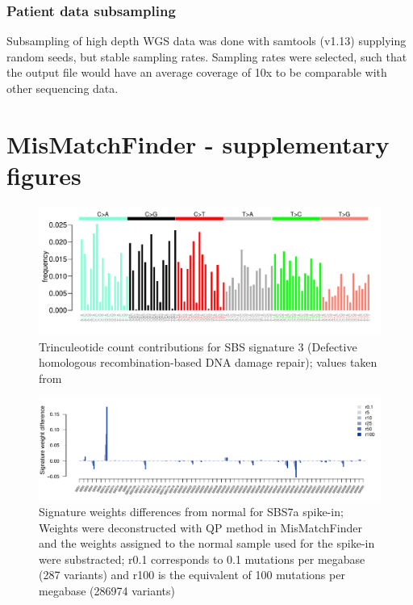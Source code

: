 \subsection{Patient data subsampling}
\label{ch-mmfAppendix:subsampling}
Subsampling of high depth WGS data was done with samtools (v1.13) supplying random seeds, but stable sampling rates. Sampling rates were selected, such that the output file would have an average coverage of 10x to be comparable with other sequencing data.



\chapter*{MisMatchFinder - supplementary figures}

\begin{figure}[ht]
\centering
\includegraphics[width=.99\linewidth]{Figures/MisMatchFinder/SBS3Signature.pdf}
\caption[Trinculeotide count contributions for single base substitution (SBS) signature 3]{Trinculeotide count contributions for SBS signature 3 (Defective homologous recombination-based DNA damage repair); values taken from \protect\textcite{Alexandrov2020}}\label{A:fig:sig3}
\end{figure}

\begin{figure}[ht]
\centering
\includegraphics[width=.99\linewidth]{Figures/MisMatchFinder/SBS7SpikeInSignatureDifferences.pdf}
\caption[Signature weights differences from normal for SBS7a spike-in]{Signature weights differences from normal for SBS7a spike-in; Weights were deconstructed with QP method in MisMatchFinder and the weights assigned to the normal sample used for the spike-in were substracted; r0.1 corresponds to 0.1 mutations per megabase (287 variants) and r100 is the equivalent of 100 mutations per megabase (286974 variants)}\label{A:fig:sbs7aspikeindifferences}
\end{figure}


